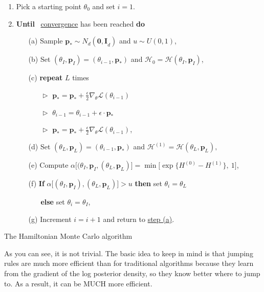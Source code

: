 \begin{algorithm}[H]\label{algo_hmc}
	\SetAlgoLined
	\begin{enumerate}
		\item Pick a starting point $\theta_0$ and set $i=1$.
		\item \textbf{Until} \ \underline{convergence} has been reached \quad \textbf{do}
		\begin{itemize}
			\item[(a)]\label{item1hmc} Sample $\boldsymbol{p}_*\sim N_d(\boldsymbol{0,I}_d)$ and $ u\sim U(0,1)$,
			\item[(b)] Set $(\theta_I,\boldsymbol{p}_I)=(\theta_{i-1},\boldsymbol{p_*})$ and $\mathcal{H}_0=\mathcal{H}(\theta_I,\boldsymbol{p}_I)$,
			\item[(c)] \textbf{repeat} $L$ times 
			\begin{itemize}
				\item[$\vartriangleright$] $ \boldsymbol{p}_*=\boldsymbol{p}_*+\frac{\epsilon}{2}\nabla_{\theta}\mathcal{L}(\theta_{i-1}) $
				\item[$\vartriangleright$] $\theta_{i-1}=\theta_{i-1}+\epsilon\cdot\boldsymbol{p}_*$
				\item[$\vartriangleright$] $ \boldsymbol{p}_*=\boldsymbol{p}_*+\frac{\epsilon}{2}\nabla_{\theta}\mathcal{L}(\theta_{i-1})$,
			\end{itemize}
			\item[(d)] Set $(\theta_L,\boldsymbol{p}_L)=(\theta_{i-1},\boldsymbol{p}_*)$ and $\mathcal{H}^{(1)}=\mathcal{H}(\theta_L,\boldsymbol{p}_L),$
			\item[(e)] Compute $\alpha\Big[(\theta_I,\boldsymbol{p}_I,(\theta_L,\boldsymbol{p}_L)\Big]=\min\Big[\exp\big\{H^{(0)}-H^{(1)}\big\},\ 1\Big]$,
			\item[(f)] \textbf{If}  $\alpha\Big[(\theta_I,\boldsymbol{p}_I),(\theta_L,\boldsymbol{p}_L)\Big]>u$  \textbf{then}  	set $\theta_i=\theta_L$ 
			\begin{itemize}
				\item[] \textbf{else}   set $\theta_i=\theta_I$,
			\end{itemize}
            \item[(g)]  Increment $i=i+1$ and return to \hyperref[item1hmc]{step (a)}.
		\end{itemize}
	\end{enumerate}
	\caption{The Hamiltonian Monte Carlo algorithm}
\end{algorithm}


As you can see, it is not trivial.
The basic idea to keep in mind is that jumping rules are much more efficient than for traditional algorithms because they
 learn from the gradient of the log posterior density, so they know better
where to jump to. As a result, it can be MUCH more efficient.


